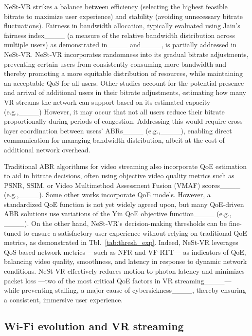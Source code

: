NeSt-VR strikes a balance between efficiency (selecting the highest feasible bitrate to maximize user experience) and stability (avoiding unnecessary bitrate fluctuations). Fairness in bandwidth allocation, typically evaluated using Jain’s fairness index____ (a measure of the relative bandwidth distribution across multiple users) as demonstrated in____ and____, is partially addressed in NeSt-VR. NeSt-VR incorporates randomness into its gradual bitrate adjustments, preventing certain users from consistently consuming more bandwidth and thereby promoting a more equitable distribution of resources, while maintaining an acceptable QoS for all users. Other studies account for the potential presence and arrival of additional users in their bitrate adjustments, estimating how many VR streams the network can support based on its estimated capacity (e.g.,____)
However, it may occur that not all users reduce their bitrate proportionally during periods of congestion. Addressing this would require cross-layer coordination between users' ABRs____ (e.g.,____), enabling direct communication for managing bandwidth distribution, albeit at the cost of additional network overhead.

Traditional ABR algorithms for video streaming also incorporate QoE estimation to aid in bitrate decisions, often using objective video quality metrics such as PSNR, SSIM, or Video Multimethod Assessment Fusion (VMAF) scores____ (e.g.,____). Some other works incorporate QoE models. However, a standardized QoE function is not yet widely agreed upon, but many QoE-driven ABR solutions use variations of the Yin QoE objective function____ (e.g., ____).
On the other hand, NeSt-VR's decision-making thresholds can be fine-tuned to ensure a satisfactory user experience without relying on traditional QoE metrics, as demonstrated in Tbl.~\ref{tab:thresh_exp}. Indeed, NeSt-VR leverages QoS-based network metrics ---such as NFR and VF-RTT--- as indicators of QoE, balancing video quality, smoothness, and latency in response to dynamic network conditions. NeSt-VR effectively reduces motion-to-photon latency and minimizes packet loss ---two of the most critical QoE factors in VR streaming____--- while preventing stalling, a major cause of cybersickness____, thereby ensuring a consistent, immersive user experience.

\subsection{Wi-Fi evolution and VR streaming}

